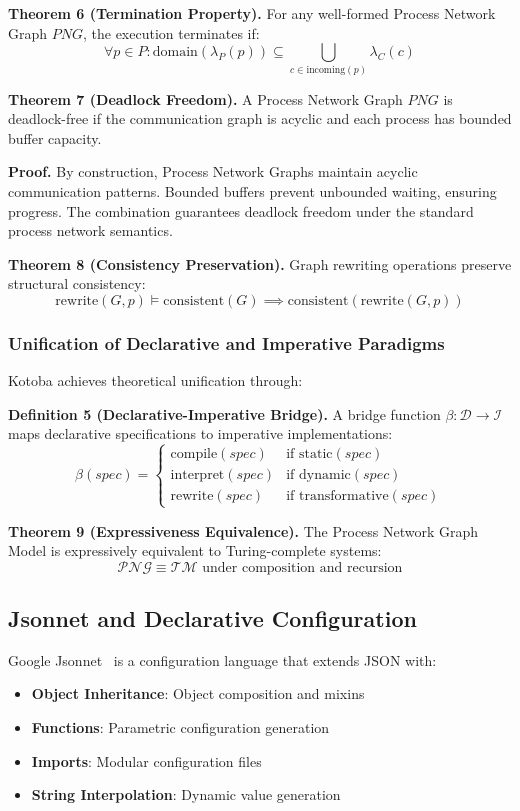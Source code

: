 \documentclass[11pt,a4paper]{article}
\begin{document}
\textbf{Theorem 6 (Termination Property).} For any well-formed Process Network Graph $PNG$, the execution terminates if:
\[
\forall p \in P: \text{domain}(\lambda_P(p)) \subseteq \bigcup_{c \in \text{incoming}(p)} \lambda_C(c)
\]

\textbf{Theorem 7 (Deadlock Freedom).} A Process Network Graph $PNG$ is deadlock-free if the communication graph is acyclic and each process has bounded buffer capacity.

\textbf{Proof.} By construction, Process Network Graphs maintain acyclic communication patterns. Bounded buffers prevent unbounded waiting, ensuring progress. The combination guarantees deadlock freedom under the standard process network semantics.

\textbf{Theorem 8 (Consistency Preservation).} Graph rewriting operations preserve structural consistency:
\[
\text{rewrite}(G, p) \models \text{consistent}(G) \implies \text{consistent}(\text{rewrite}(G, p))
\]

\subsubsection{Unification of Declarative and Imperative Paradigms}
\label{subsubsec:paradigm_unification}

Kotoba achieves theoretical unification through:

\textbf{Definition 5 (Declarative-Imperative Bridge).} A bridge function $\beta: \mathcal{D} \rightarrow \mathcal{I}$ maps declarative specifications to imperative implementations:
\[
\beta(spec) = \left\{\begin{array}{ll}
\text{compile}(spec) & \text{if } \text{static}(spec) \\
\text{interpret}(spec) & \text{if } \text{dynamic}(spec) \\
\text{rewrite}(spec) & \text{if } \text{transformative}(spec)
\end{array}\right.
\]

\textbf{Theorem 9 (Expressiveness Equivalence).} The Process Network Graph Model is expressively equivalent to Turing-complete systems:
\[
\mathcal{PNG} \equiv \mathcal{TM} \text{ under composition and recursion}
\]

\subsection{Jsonnet and Declarative Configuration}
\label{subsec:jsonnet}

Google Jsonnet~\cite{jsonnet} is a configuration language that extends JSON with:
\begin{itemize}
\item \textbf{Object Inheritance}: Object composition and mixins
\item \textbf{Functions}: Parametric configuration generation
\item \textbf{Imports}: Modular configuration files
\item \textbf{String Interpolation}: Dynamic value generation
\end{itemize}
\end{document}
